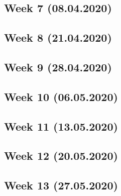\documentclass[]{article}
\begin{document}
\hypertarget{week-7-08.04.2020}{%
\subsection{Week 7 (08.04.2020)}\label{week-7-08.04.2020}}

\hypertarget{week-8-21.04.2020}{%
\subsection{Week 8 (21.04.2020)}\label{week-8-21.04.2020}}

\hypertarget{week-9-28.04.2020}{%
\subsection{Week 9 (28.04.2020)}\label{week-9-28.04.2020}}

\hypertarget{week-10-06.05.2020}{%
\subsection{Week 10 (06.05.2020)}\label{week-10-06.05.2020}}

\hypertarget{week-11-13.05.2020}{%
\subsection{Week 11 (13.05.2020)}\label{week-11-13.05.2020}}

\hypertarget{week-12-20.05.2020}{%
\subsection{Week 12 (20.05.2020)}\label{week-12-20.05.2020}}

\hypertarget{week-13-27.05.2020}{%
\subsection{Week 13 (27.05.2020)}\label{week-13-27.05.2020}}
\end{document}
